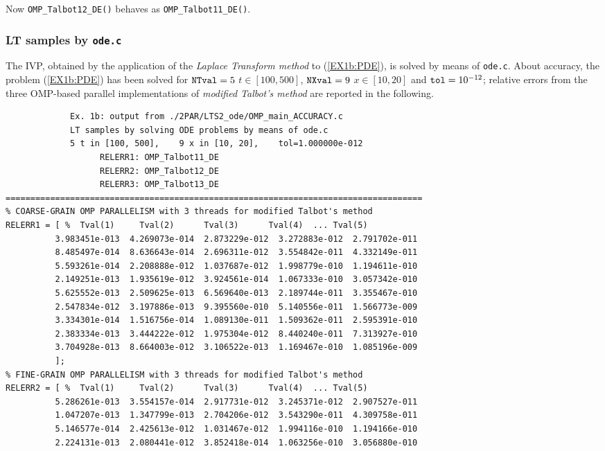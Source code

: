 \documentclass[a4paper,10pt]{report}%
\begin{document}
\noindent Now {\tt OMP\_Talbot12\_DE()} behaves as {\tt OMP\_Talbot11\_DE()}.


\newpage
\subsubsection{LT samples by {\tt ode.c}}
The IVP, obtained by the application of the {\em Laplace Transform method} to (\ref{EX1b:PDE}), is solved by means of {\tt ode.c}.
About accuracy, the problem (\ref{EX1b:PDE}) has been solved for ${\tt NTval}=5$ $t\in[100, 500]$, ${\tt NXval}=9$
$x\in[10,20]$ and ${\tt tol}=10^{-12}$; relative errors from the three OMP-based parallel implementations of
{\em modified Talbot's method} are reported in the following.
\begin{lstlisting}
             Ex. 1b: output from ./2PAR/LTS2_ode/OMP_main_ACCURACY.c
             LT samples by solving ODE problems by means of ode.c
             5 t in [100, 500],    9 x in [10, 20],    tol=1.000000e-012
                   RELERR1: OMP_Talbot11_DE
                   RELERR2: OMP_Talbot12_DE
                   RELERR3: OMP_Talbot13_DE
====================================================================================
% COARSE-GRAIN OMP PARALLELISM with 3 threads for modified Talbot's method
RELERR1 = [ %  Tval(1)     Tval(2)      Tval(3)      Tval(4)  ... Tval(5)
          3.983451e-013  4.269073e-014  2.873229e-012  3.272883e-012  2.791702e-011
          8.485497e-014  8.636643e-014  2.696311e-012  3.554842e-011  4.332149e-011
          5.593261e-014  2.208888e-012  1.037687e-012  1.998779e-010  1.194611e-010
          2.149251e-013  1.935619e-012  3.924561e-014  1.067333e-010  3.057342e-010
          5.625552e-013  2.509625e-013  6.569640e-013  2.189744e-011  3.355467e-010
          2.547834e-012  3.197886e-013  9.395560e-010  5.140556e-011  1.566773e-009
          3.334301e-014  1.516756e-014  1.089130e-011  1.509362e-011  2.595391e-010
          2.383334e-013  3.444222e-012  1.975304e-012  8.440240e-011  7.313927e-010
          3.704928e-013  8.664003e-012  3.106522e-013  1.169467e-010  1.085196e-009
          ];
% FINE-GRAIN OMP PARALLELISM with 3 threads for modified Talbot's method
RELERR2 = [ %  Tval(1)     Tval(2)      Tval(3)      Tval(4)  ... Tval(5)
          5.286261e-013  3.554157e-014  2.917731e-012  3.245371e-012  2.907527e-011
          1.047207e-013  1.347799e-013  2.704206e-012  3.543290e-011  4.309758e-011
          5.146577e-014  2.425613e-012  1.031467e-012  1.994116e-010  1.194166e-010
          2.224131e-013  2.080441e-012  3.852418e-014  1.063256e-010  3.056880e-010

\end{lstlisting}
\end{document}
